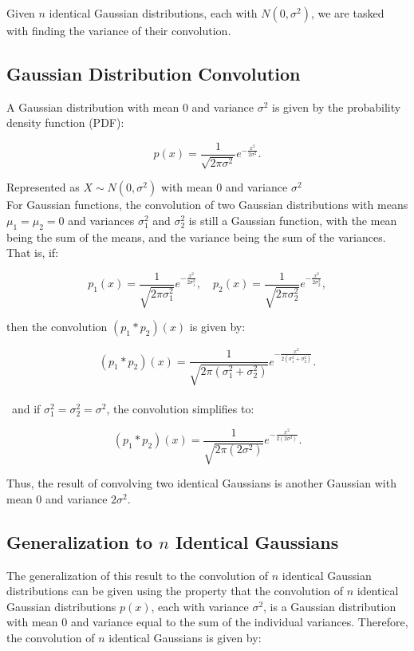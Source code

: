 \documentclass[12pt]{article}
\begin{document}
Given \( n \) identical Gaussian distributions, each with \( N(0, \sigma^2) \), we are tasked with finding the variance of their convolution.
\subsection*{Gaussian Distribution Convolution}

A Gaussian distribution with mean 0 and variance \( \sigma^2 \) is given by the probability density function (PDF):

\[
p(x) = \frac{1}{\sqrt{2\pi\sigma^2}} e^{-\frac{x^2}{2\sigma^2}}.
\]

Represented as \( X \sim N(0, \sigma^2) \) with mean \( 0 \) and variance \( \sigma^2 \) \\

For Gaussian functions, the convolution of two Gaussian distributions with means \( \mu_1 = \mu_2 = 0 \) and variances \( \sigma_1^2 \) and \( \sigma_2^2 \) is still a Gaussian function, with the mean being the sum of the means, and the variance being the sum of the variances. That is, if:

\[
p_1(x) = \frac{1}{\sqrt{2\pi\sigma_1^2}} e^{-\frac{x^2}{2\sigma_1^2}}, \quad p_2(x) = \frac{1}{\sqrt{2\pi\sigma_2^2}} e^{-\frac{x^2}{2\sigma_2^2}},
\]

then the convolution \( (p_1 * p_2)(x) \) is given by:

\[
(p_1 * p_2)(x) = \frac{1}{\sqrt{2\pi(\sigma_1^2 + \sigma_2^2)}} e^{-\frac{x^2}{2(\sigma_1^2 + \sigma_2^2)}}.
\]
\\\
and if \( \sigma_1^2 = \sigma_2^2 = \sigma^2 \), the convolution simplifies to:

\[
(p_1 * p_2)(x) = \frac{1}{\sqrt{2\pi(2\sigma^2)}} e^{-\frac{x^2}{2(2\sigma^2)}}.
\]

Thus, the result of convolving two identical Gaussians is another Gaussian with mean 0 and variance \( 2\sigma^2 \).

\subsection*{Generalization to \( n \) Identical Gaussians}

The generalization of this result to the convolution of \( n \) identical Gaussian distributions can be given using the property that the convolution of \( n \) identical Gaussian distributions \( p(x) \), each with variance \( \sigma^2 \), is a Gaussian distribution with mean 0 and variance equal to the sum of the individual variances. Therefore, the convolution of \( n \) identical Gaussians is given by:
\end{document}
